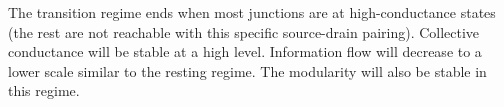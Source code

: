 \documentclass[%
 reprint,
 amsmath,amssymb,
 aps,
]{revtex4-2}
\begin{document}
The transition regime ends when most junctions are at high-conductance states (the rest are not reachable with this specific source-drain pairing). Collective conductance will be stable at a high level. Information flow will decrease to a lower scale similar to the resting regime. The modularity will also be stable in this regime.










\end{document}
